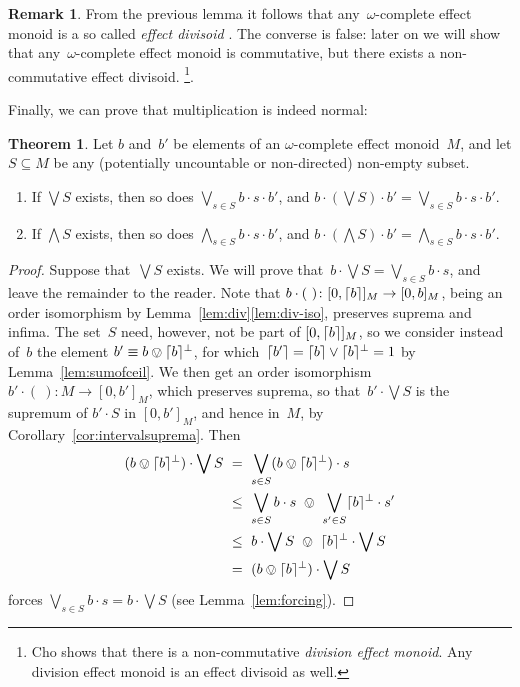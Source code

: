 \documentclass[10pt,conference]{IEEEtran}
\DeclarePairedDelimiter{\ceil}{\lceil}{\rceil}
\newcounter{counter}
\theoremstyle{definition}
\newtheorem{theorem}[counter]{Theorem}
\newtheorem{remark}[counter]{Remark}
\begin{document}
\begin{remark}
From the previous lemma it follows
    that any~$\omega$-complete effect monoid 
    is a so called \emph{effect divisoid} \cite[§195]{basthesis}.
The converse is false:
    later on we will show that any~$\omega$-complete
    effect monoid is commutative,
        but there exists a non-commutative effect divisoid.
    \cite[Ex.~4.3.9]{kentathesis}\footnote{%
        Cho shows that there is a non-commutative \emph{division effect monoid}.
        Any division effect monoid is an effect divisoid as well.}.
\end{remark}

Finally, we can prove that multiplication is indeed normal:
\begin{theorem}\label{thm:multisnormal}
    \label{prop:bsupinf}
    Let $b$ and~$b'$ be elements
    of an $\omega$-complete
    effect monoid~$M$,
    and let $S\subseteq M$ be any 
    (potentially uncountable or non-directed) non-empty subset.
    \begin{enumerate}
        \item \label{prop:bsupinf-supp}
            If $\bigvee S$ exists, then
            so does $\bigvee_{s\in S} b\cdot s \cdot b'$,
            and $b\cdot (\bigvee S ) \cdot b'
            = \bigvee_{s\in S} b\cdot s\cdot b'$.
        \item
            \label{prop:bsupinf-inf}
        If $\bigwedge S$ exists, then
            so does $\bigwedge_{s\in S} b\cdot s \cdot b'$,
            and $b\cdot (\bigwedge S) \cdot b' = \bigwedge_{s\in S} 
            b\cdot s\cdot b'$.
    \end{enumerate}
\end{theorem}
\begin{proof}
Suppose that~$\bigvee S$ exists.
    We will prove that~$b\cdot \bigvee S=\bigvee_{s\in S} b\cdot s$,
and leave the remainder to the reader.
    Note that  $b\cdot(\ )\colon [0,\ceil{b}]_M\to [0,b]_M$,
    being an order isomorphism by Lemma~\ref{lem:div}\eqref{lem:div-iso},
    preserves suprema and infima.
    The set~$S$ need, however, not be part of $[0,\ceil{b}]_M$,
    so we consider instead of~$b$
    the element $b'\equiv  b\ovee \ceil{b}^\perp$,
    for which~$\ceil{b'}=\ceil{b}\vee \ceil{b}^\perp =1$
    by Lemma~\ref{lem:sumofceil}.
    We then get an order isomorphism~${b'\cdot(\ )\colon M\to [0,b']_M}$,
    which preserves suprema,
    so that~$b'\cdot \bigvee S$
is the supremum of $b'\cdot S$ in $[0,b']_M$,
    and hence in~$M$, by Corollary~\ref{cor:intervalsuprema}.
    Then
\begin{alignat*}{3}
    (b\ovee \ceil{b}^\perp)\cdot \bigvee S 
    \ &=\ \bigvee_{s\in S} (b\ovee \ceil{b}^\perp)\cdot s \\
    \ &\leq\ \bigvee_{s\in S} b\cdot  s 
    \ \ovee\ \bigvee_{s'\in S} \ceil{b}^\perp \cdot   s' \\
    \ &\leq\ b\cdot \bigvee S \ \ovee\ \ceil{b}^\perp\cdot \bigvee S \\
    \ & = \ (b\ovee \ceil{b}^\perp)\cdot\bigvee S
\end{alignat*}
forces $\bigvee_{s\in S} b\cdot s= b\cdot \bigvee S$
    (see Lemma~\ref{lem:forcing}).
\end{proof}
\end{document}
